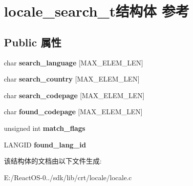 \hypertarget{structlocale__search__t}{}\section{locale\+\_\+search\+\_\+t结构体 参考}
\label{structlocale__search__t}
\subsection*{Public 属性}
\begin{DoxyCompactItemize}
\item 
\mbox{\label{structlocale__search__t_aa5363be9d9540f8e052212b754cf53db}} 
char {\bfseries search\+\_\+language} \mbox{[}M\+A\+X\+\_\+\+E\+L\+E\+M\+\_\+\+L\+EN\mbox{]}
\item 
\mbox{\label{structlocale__search__t_a93d71e20c0091021a30110ed7a8f5979}} 
char {\bfseries search\+\_\+country} \mbox{[}M\+A\+X\+\_\+\+E\+L\+E\+M\+\_\+\+L\+EN\mbox{]}
\item 
\mbox{\label{structlocale__search__t_acbf755e52129244afbf00f20152ce9a8}} 
char {\bfseries search\+\_\+codepage} \mbox{[}M\+A\+X\+\_\+\+E\+L\+E\+M\+\_\+\+L\+EN\mbox{]}
\item 
\mbox{\label{structlocale__search__t_aa7bf1026abdbaf18663f663db24c3639}} 
char {\bfseries found\+\_\+codepage} \mbox{[}M\+A\+X\+\_\+\+E\+L\+E\+M\+\_\+\+L\+EN\mbox{]}
\item 
\mbox{\label{structlocale__search__t_a4f7f8836b6a5b3989b9624b676881fcc}} 
unsigned int {\bfseries match\+\_\+flags}
\item 
\mbox{\label{structlocale__search__t_a74db12c54154ecf6b3baa364938f2c39}} 
L\+A\+N\+G\+ID {\bfseries found\+\_\+lang\+\_\+id}
\end{DoxyCompactItemize}


该结构体的文档由以下文件生成\+:\begin{DoxyCompactItemize}
\item 
E\+:/\+React\+O\+S-\/0../sdk/lib/crt/locale/locale.\+c\end{DoxyCompactItemize}
